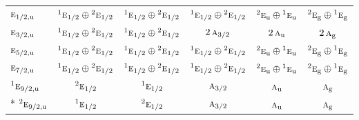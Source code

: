 \documentclass[10pt,a4paper]{article}
\numberwithin{equation}{section}
\newcommand{\irr}[1]{\text{\normalfont\scshape #1}}
\newcommand{\conjpair}[1]{{}^{#1}}
\newcommand{\ptag}[1]{\mathrm{#1}}
\begin{document}
{\begin{longtable}{@{}lccccc@{}}
$\irr{e}_{1/2,\ptag{u}}$ & $\conjpair{1}\irr{e}_{1/2}\oplus \conjpair{2}\irr{e}_{1/2}$ & $\conjpair{1}\irr{e}_{1/2}\oplus \conjpair{2}\irr{e}_{1/2}$ & $\conjpair{1}\irr{e}_{1/2}\oplus \conjpair{2}\irr{e}_{1/2}$ & $\conjpair{2}\irr{e}_{\ptag{u}}\oplus \conjpair{1}\irr{e}_{\ptag{u}}$ & $\conjpair{2}\irr{e}_{\ptag{g}}\oplus \conjpair{1}\irr{e}_{\ptag{g}}$\\
$\irr{e}_{3/2,\ptag{u}}$ & $\conjpair{1}\irr{e}_{1/2}\oplus \conjpair{2}\irr{e}_{1/2}$ & $\conjpair{1}\irr{e}_{1/2}\oplus \conjpair{2}\irr{e}_{1/2}$ & $2\,\irr{a}_{3/2}$ & $2\,\irr{a}_{\ptag{u}}$ & $2\,\irr{a}_{\ptag{g}}$\\
$\irr{e}_{5/2,\ptag{u}}$ & $\conjpair{1}\irr{e}_{1/2}\oplus \conjpair{2}\irr{e}_{1/2}$ & $\conjpair{1}\irr{e}_{1/2}\oplus \conjpair{2}\irr{e}_{1/2}$ & $\conjpair{1}\irr{e}_{1/2}\oplus \conjpair{2}\irr{e}_{1/2}$ & $\conjpair{2}\irr{e}_{\ptag{u}}\oplus \conjpair{1}\irr{e}_{\ptag{u}}$ & $\conjpair{2}\irr{e}_{\ptag{g}}\oplus \conjpair{1}\irr{e}_{\ptag{g}}$\\
$\irr{e}_{7/2,\ptag{u}}$ & $\conjpair{1}\irr{e}_{1/2}\oplus \conjpair{2}\irr{e}_{1/2}$ & $\conjpair{1}\irr{e}_{1/2}\oplus \conjpair{2}\irr{e}_{1/2}$ & $\conjpair{1}\irr{e}_{1/2}\oplus \conjpair{2}\irr{e}_{1/2}$ & $\conjpair{2}\irr{e}_{\ptag{u}}\oplus \conjpair{1}\irr{e}_{\ptag{u}}$ & $\conjpair{2}\irr{e}_{\ptag{g}}\oplus \conjpair{1}\irr{e}_{\ptag{g}}$\\
$\conjpair{1}\irr{e}_{9/2,\ptag{u}}$ & $\conjpair{2}\irr{e}_{1/2}$ & $\conjpair{1}\irr{e}_{1/2}$ & $\irr{a}_{3/2}$ & $\irr{a}_{\ptag{u}}$ & $\irr{a}_{\ptag{g}}$\\*
$\conjpair{2}\irr{e}_{9/2,\ptag{u}}$ & $\conjpair{1}\irr{e}_{1/2}$ & $\conjpair{2}\irr{e}_{1/2}$ & $\irr{a}_{3/2}$ & $\irr{a}_{\ptag{u}}$ & $\irr{a}_{\ptag{g}}$\\
\bottomrule\end{longtable}}
\end{document}
